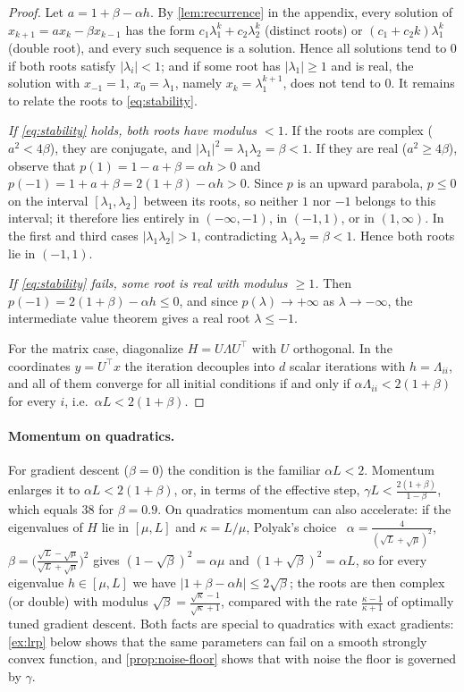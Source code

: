\begin{proof}
Let $a=1+\beta-\alpha h$. By \cref{lem:recurrence} in the appendix, every solution of
$x_{k+1}=ax_k-\beta x_{k-1}$ has the form $c_1\lambda_1^k+c_2\lambda_2^k$ (distinct roots)
or $(c_1+c_2k)\lambda_1^k$ (double root), and every such sequence is a solution. Hence all
solutions tend to $0$ if both roots satisfy $|\lambda_i|<1$; and if some root has
$|\lambda_1|\ge1$ and is real, the solution with $x_{-1}=1$, $x_0=\lambda_1$, namely
$x_k=\lambda_1^{k+1}$, does not tend to $0$. It remains to relate the roots to
\eqref{eq:stability}.

\emph{If \eqref{eq:stability} holds, both roots have modulus $<1$.} If the roots are complex
($a^2<4\beta$), they are conjugate, and $|\lambda_1|^2=\lambda_1\lambda_2=\beta<1$. If they are
real ($a^2\ge4\beta$), observe that $p(1)=1-a+\beta=\alpha h>0$ and
$p(-1)=1+a+\beta=2(1+\beta)-\alpha h>0$. Since $p$ is an upward parabola, $p\le0$ on the
interval $[\lambda_1,\lambda_2]$ between its roots, so neither $1$ nor $-1$ belongs to this
interval; it therefore lies entirely in $(-\infty,-1)$, in $(-1,1)$, or in $(1,\infty)$.
In the first and third cases $|\lambda_1\lambda_2|>1$, contradicting $\lambda_1\lambda_2=\beta<1$.
Hence both roots lie in $(-1,1)$.

\emph{If \eqref{eq:stability} fails, some root is real with modulus $\ge1$.} Then
$p(-1)=2(1+\beta)-\alpha h\le0$, and since $p(\lambda)\to+\infty$ as $\lambda\to-\infty$,
the intermediate value theorem gives a real root $\lambda\le-1$.

For the matrix case, diagonalize $H=U\Lambda U^\top$ with $U$ orthogonal. In the coordinates
$y=U^\top x$ the iteration decouples into $d$ scalar iterations with $h=\Lambda_{ii}$, and all
of them converge for all initial conditions if and only if $\alpha\Lambda_{ii}<2(1+\beta)$
for every $i$, i.e.\ $\alpha L<2(1+\beta)$.
\end{proof}

\paragraph{Momentum on quadratics.} For gradient descent ($\beta=0$) the condition is the
familiar $\alpha L<2$. Momentum enlarges it to $\alpha L<2(1+\beta)$, or, in terms of the
effective step, $\gamma L<\frac{2(1+\beta)}{1-\beta}$, which equals $38$ for $\beta=0.9$. On
quadratics momentum can also accelerate: if the eigenvalues of $H$ lie in $[\mu,L]$ and
$\kappa=L/\mu$, Polyak's choice~\cite{polyak1964}
$\alpha=\frac{4}{(\sqrt L+\sqrt\mu)^2}$, $\beta=\bigl(\frac{\sqrt L-\sqrt\mu}{\sqrt L+\sqrt\mu}\bigr)^2$
gives $(1-\sqrt\beta)^2=\alpha\mu$ and $(1+\sqrt\beta)^2=\alpha L$, so for every eigenvalue
$h\in[\mu,L]$ we have $|1+\beta-\alpha h|\le2\sqrt\beta$; the roots are then complex (or
double) with modulus $\sqrt\beta=\frac{\sqrt\kappa-1}{\sqrt\kappa+1}$, compared with the
rate $\frac{\kappa-1}{\kappa+1}$ of optimally tuned gradient descent. Both facts are special
to quadratics with exact gradients: \cref{ex:lrp} below shows that the same parameters can
fail on a smooth strongly convex function, and \cref{prop:noise-floor} shows that with
noise the floor is governed by $\gamma$.

